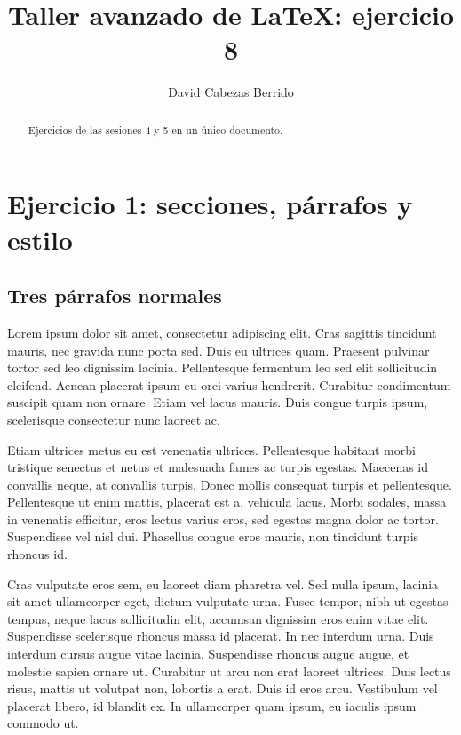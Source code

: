 \documentclass[a4paper,10pt]{article}
\author{David Cabezas Berrido}
\title{Taller avanzado de \LaTeX: ejercicio 8}
\date{}
\theoremstyle{teorema}
\theoremstyle{plano}
\theoremstyle{titulo}
\begin{document}
\maketitle

\begin{abstract}
Ejercicios de las sesiones 4 y 5 en un único documento.
\end{abstract}

\tableofcontents

\section{Ejercicio 1: secciones, párrafos y estilo}

\subsection{Tres párrafos normales}

Lorem ipsum dolor sit amet, consectetur adipiscing elit. Cras sagittis tincidunt mauris, nec gravida nunc porta sed. Duis eu ultrices quam. Praesent pulvinar tortor sed leo dignissim lacinia. Pellentesque fermentum leo sed elit sollicitudin eleifend. Aenean placerat ipsum eu orci varius hendrerit. Curabitur condimentum suscipit quam non ornare. Etiam vel lacus mauris. Duis congue turpis ipsum, scelerisque consectetur nunc laoreet ac.

Etiam ultrices metus eu est venenatis ultrices. Pellentesque habitant morbi tristique senectus et netus et malesuada fames ac turpis egestas. Maecenas id convallis neque, at convallis turpis. Donec mollis consequat turpis et pellentesque. Pellentesque ut enim mattis, placerat est a, vehicula lacus. Morbi sodales, massa in venenatis efficitur, eros lectus varius eros, sed egestas magna dolor ac tortor. Suspendisse vel nisl dui. Phasellus congue eros mauris, non tincidunt turpis rhoncus id.

Cras vulputate eros sem, eu laoreet diam pharetra vel. Sed nulla ipsum, lacinia sit amet ullamcorper eget, dictum vulputate urna. Fusce tempor, nibh ut egestas tempus, neque lacus sollicitudin elit, accumsan dignissim eros enim vitae elit. Suspendisse scelerisque rhoncus massa id placerat. In nec interdum urna. Duis interdum cursus augue vitae lacinia. Suspendisse rhoncus augue augue, et molestie sapien ornare ut. Curabitur ut arcu non erat laoreet ultrices. Duis lectus risus, mattis ut volutpat non, lobortis a erat. Duis id eros arcu. Vestibulum vel placerat libero, id blandit ex. In ullamcorper quam ipsum, eu iaculis ipsum commodo ut.
\end{document}
